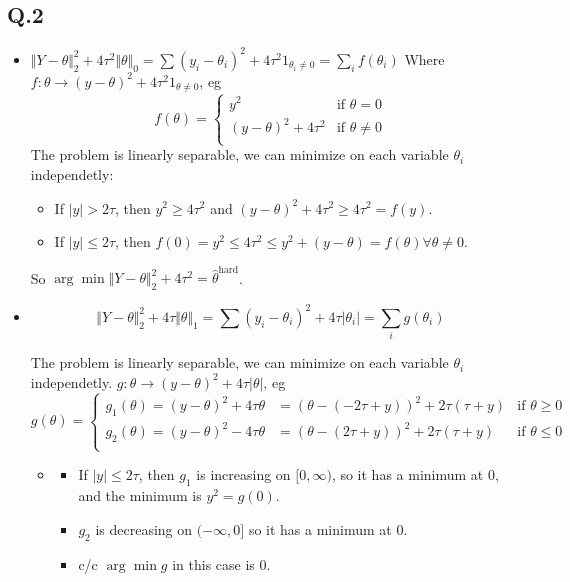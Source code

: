 \documentclass[12pt]{article}
\newcommand{\Q}[1]{\subsection*{Q.#1}}
\newenvironment{question}[1]
{\Q{#1}}{}
\begin{document}
\begin{question}{2}
  \begin{itemize}
  \item 
  $\Vert Y - \theta\Vert _2^2 + 4\tau^2 \Vert \theta\Vert _0 = \sum (y_i - \theta_i)^2 + 4\tau^2 1_{\theta_i \ne 0} = \sum_i f(\theta_i)$
  Where $f: \theta \rightarrow (y - \theta)^2 + 4\tau^2 1_{\theta \ne 0}$, eg
  \[
    f(\theta) = \left\{
      \begin{array}{cc}
        y^2 & \text{if } \theta = 0\\
        (y - \theta)^2 + 4 \tau^2& \text{if } \theta \ne 0\\
      \end{array}
    \right.
  \]
  The problem is linearly separable, we can minimize on each variable
  $\theta_i$ independetly:
  \begin{itemize}
  \item If $|y| > 2\tau$, then $y^2 \ge 4\tau^2$ and
    $(y - \theta)^2 + 4\tau^2 \ge 4\tau^2 = f(y)$.
  \item If $|y| \le 2\tau$, then
    $f(0) = y^2 \le 4\tau^2 \le y^2 + (y-\theta) = f(\theta) \forall
    \theta \ne 0$.
  \end{itemize}
  So
  $\arg\min \Vert Y - \theta\Vert _2^2 + 4\tau^2 = \hat
  \theta^{\text{hard}}$.
  
\item 
  $$ \Vert Y - \theta\Vert _2^2 + 4\tau \Vert \theta\Vert _1 = \sum
  (y_i - \theta_i)^2 + 4\tau |\theta_i| = \sum_i g(\theta_i)
  $$

  The problem is linearly separable, we can minimize on each variable
  $\theta_i$ independetly.
  $g: \theta \rightarrow (y - \theta)^2 + 4\tau |\theta|$, eg
  \[
    g(\theta) = \left\{
      \begin{array}{ccc}
        g_1(\theta) = (y - \theta)^2 + 4 \tau \theta&= (\theta - (-2\tau+y) )^2 + 2\tau(\tau+y) & \text{if } \theta \ge 0\\
        g_2(\theta) = (y - \theta)^2 - 4 \tau \theta&= (\theta - (2\tau+y) )^2 + 2\tau(\tau+y)  & \text{if } \theta \le 0\\
      \end{array}
    \right.
  \]



  \begin{itemize}
  \item
    \begin{itemize}
    \item If $|y| \le 2\tau$, then $g_1$ is increasing on  $[0, \infty)$, so it has a minimum at $0$, and the minimum is   $y^2 = g(0)$.
    \item   $g_2$ is decreasing on $(-\infty, 0]$ so it has a  minimum at 0.
    \item   c/c $\arg\min g$ in this case is 0.
    \end{itemize}


\end{itemize}
\end{itemize}
\end{question}
\end{document}

